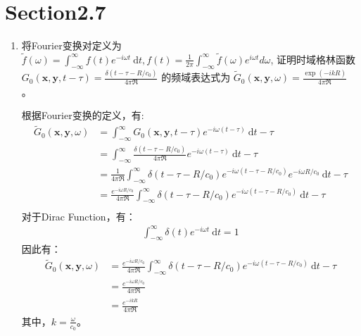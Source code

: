 \section*{Section2.7}

\begin{enumerate}
    \item 将Fourier变换对定义为
    \( \tilde{f}(\omega)=\int_{-\infty}^{\infty} f(t) e^{-i \omega t} \mathrm{~d} t, 
    f(t)=\frac{1}{2 \pi} \int_{-\infty}^{\infty} \tilde{f}(\omega) e^{i \omega t} d \omega \), 
    证明时域格林函数
    \( G_{0}(\boldsymbol{x}, \boldsymbol{y}, t-\tau)=\frac{\delta\left(t-\tau-R / c_{0}\right)}{4 \pi \Re} \)
    的频域表达式为
    \( \tilde{G}_{0}(\boldsymbol{x}, \boldsymbol{y}, \omega)=\frac{\exp (-i k R)}{4 \pi \Re} \) 。

        根据Fourier变换的定义，有:
        \begin{equation}
            \begin{aligned}
                \tilde{G}_{0}(\boldsymbol{x}, \boldsymbol{y}, \omega)
                &= \int_{-\infty}^{\infty} G_{0}(\boldsymbol{x}, \boldsymbol{y}, t-\tau) e^{-i \omega (t-\tau)} \mathrm{~d} t - \tau \\
                &= \int_{-\infty}^{\infty} \frac{\delta\left(t-\tau-R / c_{0}\right)}{4 \pi \Re} e^{-i \omega (t-\tau)} \mathrm{~d} t - \tau \\
                &= \frac{1}{{4 \pi \Re}} \int_{-\infty}^{\infty} \delta\left(t-\tau-R / c_{0}\right) e^{-i \omega (t-\tau-R/c_{0})} e^{ - i \omega R/c_{0}} \mathrm{~d} t - \tau \\
                &= \frac{e^{ - i \omega R/c_{0}}}{{4 \pi \Re}} \int_{-\infty}^{\infty} \delta\left(t-\tau-R / c_{0}\right) e^{-i \omega (t-\tau-R/c_{0})} \mathrm{~d} t - \tau \\
            \end{aligned}
        \end{equation}
        对于Dirac Function，有：
        \begin{equation}
            \begin{aligned}
                \int_{-\infty}^{\infty} \delta\left( t \right) e^{-i \omega t} \mathrm{~d} t = 1
            \end{aligned}
        \end{equation}
        因此有：
        \begin{equation}
            \begin{aligned}
                \tilde{G}_{0}(\boldsymbol{x}, \boldsymbol{y}, \omega)
                &= \frac{e^{ - i \omega R/c_{0}}}{{4 \pi \Re}} \int_{-\infty}^{\infty} \delta\left(t-\tau-R / c_{0}\right) e^{-i \omega (t-\tau-R/c_{0})} \mathrm{~d} t - \tau \\
                &= \frac{e^{ - i \omega R/c_{0}}}{{4 \pi \Re}} \\
                &= \frac{e^{ - i k R}}{{4 \pi \Re}}
            \end{aligned}
        \end{equation}
        其中，\(k = \frac{\omega}{c_{0}}\)。


\end{enumerate}
